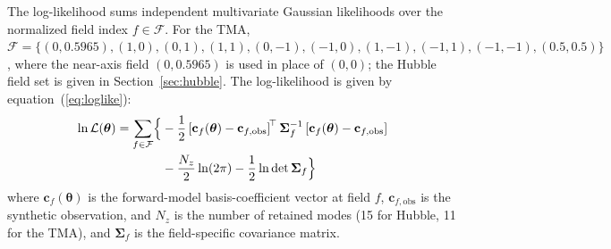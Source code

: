 \documentclass[fleqn,usenatbib]{rasti}
\begin{document}
The log-likelihood sums independent multivariate Gaussian likelihoods over the normalized field index $f\in\mathcal{F}$. For the TMA, $\mathcal{F} = \{(0,0.5965),\allowbreak(1,0),\allowbreak(0,1),\allowbreak(1,1),\allowbreak(0,-1),\allowbreak(-1,0),\allowbreak(1,-1),\allowbreak(-1,1),\allowbreak(-1,-1),\allowbreak(0.5,0.5)\}$, where the near-axis field $(0,0.5965)$ is used in place of $(0,0)$; the Hubble field set is given in Section~\ref{sec:hubble}. The log-likelihood is given by equation~(\ref{eq:loglike}):
\begin{equation}
\begin{split}
\ln \mathcal{L}(\boldsymbol{\theta})
= \sum_{f \in \mathcal{F}} \Bigl\{
&-\frac{1}{2}
\left[\mathbf{c}_f(\boldsymbol{\theta}) - \mathbf{c}_{f,\mathrm{obs}}\right]^{\!\top}
\boldsymbol{\Sigma}_f^{-1}
\left[\mathbf{c}_f(\boldsymbol{\theta}) - \mathbf{c}_{f,\mathrm{obs}}\right] \\
&-\frac{N_z}{2}\ln(2\pi)
-\frac{1}{2}\ln\det\boldsymbol{\Sigma}_f
\Bigr\}
\end{split}
\label{eq:loglike}
\end{equation}
where $\mathbf{c}_f(\boldsymbol{\theta})$ is the forward-model basis-coefficient vector at field $f$, $\mathbf{c}_{f,\mathrm{obs}}$ is the synthetic observation, and $N_z$ is the number of retained modes (15 for Hubble, 11 for the TMA), and $\boldsymbol{\Sigma}_f$ is the field-specific covariance matrix.
\end{document}
